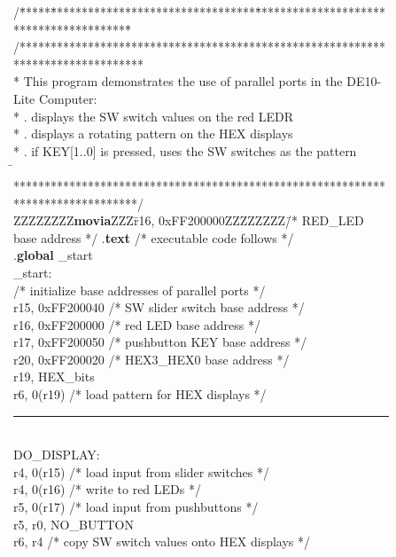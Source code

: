 \begin{figure}[h!]
\begin{center}
\begin{minipage}[t]{12.5 cm}
\begin{tabbing}
/\=*****\=*********************************\=****************************************\=\kill
/********************************************************************************\\
\>* This program demonstrates the use of parallel ports in the DE10-Lite Computer:\\
\>* . displays the SW switch values on the red LEDR\\
\>* . displays a rotating pattern on the HEX displays\\
\>* . if KEY[1..0] is pressed, uses the SW switches as the pattern\\
\=\kill
\>********************************************************************************/\\
ZZZZZZZZ\={\bf movia}ZZZ\=r16, 0xFF200000ZZZZZZZZ\=/* RED\_LED base address */\kill
\>.{\bf text}	\>\>/* executable code follows */\\
\>.{\bf global} \>\_start\\
\_start:\\
\>/* initialize base addresses of parallel ports */\\
 \>r15, 0xFF200040 \>/* SW slider switch base address */\\
 \>r16, 0xFF200000 \>/* red LED base address */\\
 \>r17, 0xFF200050 \>/* pushbutton KEY base address */\\
 \>r20, 0xFF200020 \>/* HEX3\_HEX0 base address */\\
 \>r19, HEX\_bits\\
 \>r6, 0(r19) \>/* load pattern for HEX displays */\\
\rule{6.0in}{0in}~\\
DO\_DISPLAY:\\
 \>r4, 0(r15) \>/* load input from slider switches */\\
 \>r4, 0(r16) \>/* write to red LEDs */\\
 \>r5, 0(r17) \>/* load input from pushbuttons */\\
 \>r5, r0, NO\_BUTTON\\
 \>r6, r4 \>/* copy SW switch values onto HEX displays */\\

\end{tabbing}
\end{minipage}
\end{center}
\end{figure}
